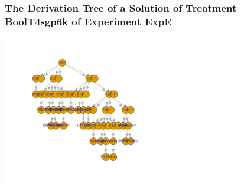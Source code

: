  \begin{frame}
 \frametitle{ The Derivation Tree of a Solution of Treatment BoolT4sgp6k of Experiment ExpE }
 \begin{center}
\includegraphics[width=0.5\textwidth, angle=0]
{ExpEDerivationTreeFigure004.pdf}
 \end{center}
 \label{report/ExpEDerivationTreeFigure004.pdf}  
 \end{frame}

